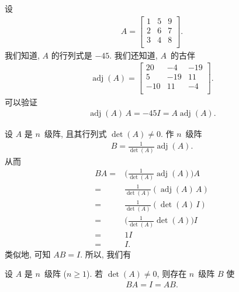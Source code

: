 \documentclass[%
    UTF8,%
    fontset=none,%
    punct=kaiming,%
    zihao=-4,%
    a4paper,%
    oneside,%
]{ctexbook}
\renewcommand*{\geq}{\geqslant}
\begin{document}
\begin{example}
    设
    \begin{align*}
        A =
        \begin{bmatrix}
            1 & 5 & 9 \\
            2 & 6 & 7 \\
            3 & 4 & 8 \\
        \end{bmatrix}.
    \end{align*}
    我们知道, \(A\) 的行列式是 \(-45\).
    我们还知道, \(A\)~的古伴
    \begin{align*}
        \operatorname{adj} {(A)} =
        \begin{bmatrix}
            20  & -4  & -19 \\
            5   & -19 & 11  \\
            -10 & 11  & -4  \\
        \end{bmatrix}.
    \end{align*}
    可以验证
    \begin{align*}
        \operatorname{adj} {(A)}\, A
        = -45I
        = A\operatorname{adj} {(A)}.
    \end{align*}
\end{example}

设 \(A\) 是 \(n\)~级阵,
且其行列式 \(\det {(A)} \neq 0\).
作 \(n\)~级阵
\begin{align*}
    B = \frac{1}{\det {(A)}} \operatorname{adj} {(A)}.
\end{align*}
从而
\begin{align*}
    BA
    = {} & \Big( \frac{1}{\det {(A)}}
    \operatorname{adj} {(A)} \Big) A
    \\
    = {} & \frac{1}{\det {(A)}} (\operatorname{adj} {(A)}\, A)
    \\
    = {} & \frac{1}{\det {(A)}} (\det {(A)}\, I)
    \\
    = {} & \Big( \frac{1}{\det {(A)}} \det {(A)} \Big) I
    \\
    = {} & 1I
    \\
    = {} & I.
\end{align*}
类似地, 可知 \(AB = I\).
所以, 我们有

\begin{theorem}
    设 \(A\) 是 \(n\)~级阵 (\(n \geq 1\)).
    若 \(\det {(A)} \neq 0\),
    则存在 \(n\)~级阵 \(B\) 使
    \begin{align*}
        BA = I = AB.
    \end{align*}
\end{theorem}
\end{document}
